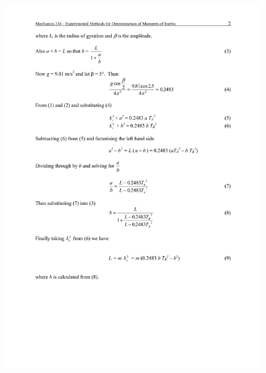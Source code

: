\begin{figure}
 \includegraphics[width=\linewidth]{lab1/lab1-2}
  \caption*{}
\label{}
\end{figure}
